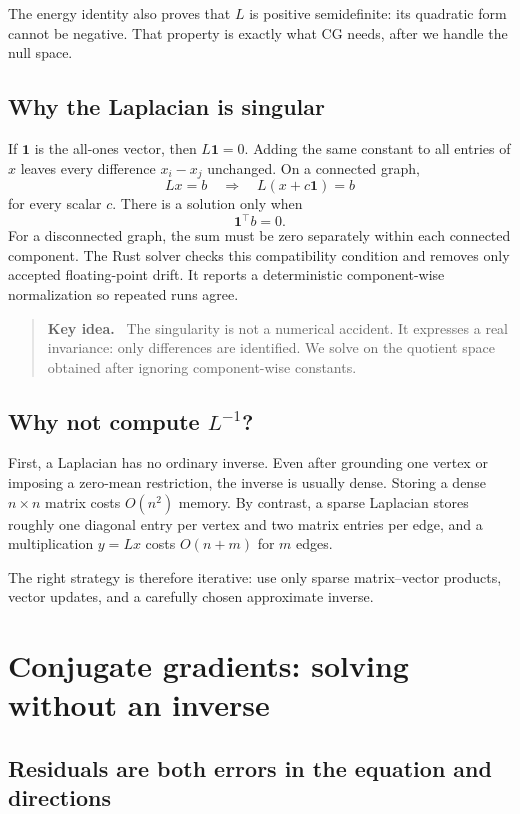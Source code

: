 \documentclass[11pt]{article}
\newenvironment{takeaway}{\begin{quote}\color{cmgnavy}\textbf{Key idea.}\ }{\end{quote}}
\begin{document}
The energy identity also proves that $L$ is positive semidefinite: its quadratic form cannot be negative.  That property is exactly what CG needs, after we handle the null space.

\subsection{Why the Laplacian is singular}

If $\mathbf{1}$ is the all-ones vector, then $L\mathbf{1}=0$.  Adding the same constant to all entries of $x$ leaves every difference $x_i-x_j$ unchanged.  On a connected graph,
\[
  Lx=b \quad\Longrightarrow\quad L(x+c\mathbf{1})=b
\]
for every scalar $c$.  There is a solution only when
\[
  \mathbf{1}^\top b=0.
  \tag{3}\label{eq:compatibility}
\]
For a disconnected graph, the sum must be zero separately within each connected component.  The Rust solver checks this compatibility condition and removes only accepted floating-point drift.  It reports a deterministic component-wise normalization so repeated runs agree.

\begin{takeaway}
The singularity is not a numerical accident.  It expresses a real invariance: only differences are identified.  We solve on the quotient space obtained after ignoring component-wise constants.
\end{takeaway}

\subsection{Why not compute $L^{-1}$?}

First, a Laplacian has no ordinary inverse.  Even after grounding one vertex or imposing a zero-mean restriction, the inverse is usually dense.  Storing a dense $n\times n$ matrix costs $O(n^2)$ memory.  By contrast, a sparse Laplacian stores roughly one diagonal entry per vertex and two matrix entries per edge, and a multiplication $y=Lx$ costs $O(n+m)$ for $m$ edges.

The right strategy is therefore iterative: use only sparse matrix--vector products, vector updates, and a carefully chosen approximate inverse.

\section{Conjugate gradients: solving without an inverse}

\subsection{Residuals are both errors in the equation and directions}
\end{document}
